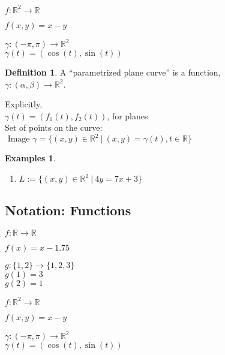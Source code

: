 \documentclass[twocolumn,20pt,fleqn]{extarticle}
\newcommand{\sep}{\vspace{0.5cm}}
\theoremstyle{plain}
\theoremstyle{definition}
\newtheorem*{definition}{Definition}
\newtheorem*{exmpls}{Examples}
\theoremstyle{remark}
\newenvironment*{examples}{\begin{exmpls} ~ \begin{enumerate}}{\end{enumerate}\end{exmpls}}
\begin{document}
$ f: \mathbb{R}^2  \to \mathbb{R}$

$f(  x,y  ) = x - y$


\sep

$\gamma :  (-\pi,\pi)  \to \mathbb{R}^2$\\
$\gamma(t) = (\cos(t), \sin(t))$



\newpage



\begin{definition}
  A  ``parametrized plane curve''  is a  function,\\ $\gamma  : (\alpha, \beta) \to \mathbb{R}^2$.
\end{definition}

Explicitly,\\
$\gamma(t) = (f_1(t), f_2(t))$, for planes\\

Set of points on the curve:\\  $\textrm{ Image } \gamma = \{(x,y) \in \mathbb{R}^2 \ |\ (x,y) = \gamma(t), t \in \mathbb{R}\}$




\begin{examples}
  \item $L:=\{(x,y) \in \mathbb{R}^2\ |\ 4y = 7x + 3\}$\\
  \end{examples}


\clearpage




\subsection{Notation: Functions}

$ f: \mathbb{R}  \to \mathbb{R}$

$f(x) = x - 1.75$\\

\sep

  $g : \{1,2\} \to \{1,2,3\}$\\
    $g(1) = 3$\\
    $g(2) = 1$\\

\sep

$ f: \mathbb{R}^2  \to \mathbb{R}$

$f(  x,y  ) = x - y$


\sep

$\gamma :  (-\pi,\pi)  \to \mathbb{R}^2$\\
$\gamma(t) = (\cos(t), \sin(t))$
\end{document}
